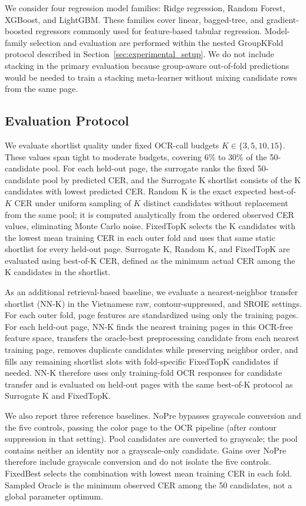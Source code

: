 \documentclass[pdflatex,sn-basic,Numbered,iicol]{sn-jnl}
\begin{document}
We consider four regression model families: Ridge regression, Random Forest, XGBoost, and LightGBM. These families cover linear, bagged-tree, and gradient-boosted regressors commonly used for feature-based tabular regression. Model-family selection and evaluation are performed within the nested GroupKFold protocol described in Section~\ref{sec:experimental_setup}. We do not include stacking in the primary evaluation because group-aware out-of-fold predictions would be needed to train a stacking meta-learner without mixing candidate rows from the same page.

\subsection{Evaluation Protocol}

We evaluate shortlist quality under fixed OCR-call budgets $K \in \{3, 5, 10, 15\}$. These values span tight to moderate budgets, covering 6\% to 30\% of the 50-candidate pool. For each held-out page, the surrogate ranks the fixed 50-candidate pool by predicted CER, and the Surrogate K shortlist consists of the K candidates with lowest predicted CER. Random K is the exact expected best-of-$K$ CER under uniform sampling of $K$ distinct candidates without replacement from the same pool; it is computed analytically from the ordered observed CER values, eliminating Monte Carlo noise. FixedTopK selects the K candidates with the lowest mean training CER in each outer fold and uses that same static shortlist for every held-out page. Surrogate K, Random K, and FixedTopK are evaluated using best-of-K CER, defined as the minimum actual CER among the K candidates in the shortlist.

As an additional retrieval-based baseline, we evaluate a nearest-neighbor transfer shortlist (NN-K) in the Vietnamese raw, contour-suppressed, and SROIE settings. For each outer fold, page features are standardized using only the training pages. For each held-out page, NN-K finds the nearest training pages in this OCR-free feature space, transfers the oracle-best preprocessing candidate from each nearest training page, removes duplicate candidates while preserving neighbor order, and fills any remaining shortlist slots with fold-specific FixedTopK candidates if needed. NN-K therefore uses only training-fold OCR responses for candidate transfer and is evaluated on held-out pages with the same best-of-K protocol as Surrogate K and FixedTopK.

We also report three reference baselines. NoPre bypasses grayscale conversion and the five controls, passing the color page to the OCR pipeline (after contour suppression in that setting). Pool candidates are converted to grayscale; the pool contains neither an identity nor a grayscale-only candidate. Gains over NoPre therefore include grayscale conversion and do not isolate the five controls. FixedBest selects the combination with lowest mean training CER in each fold. Sampled Oracle is the minimum observed CER among the 50 candidates, not a global parameter optimum.
\end{document}
